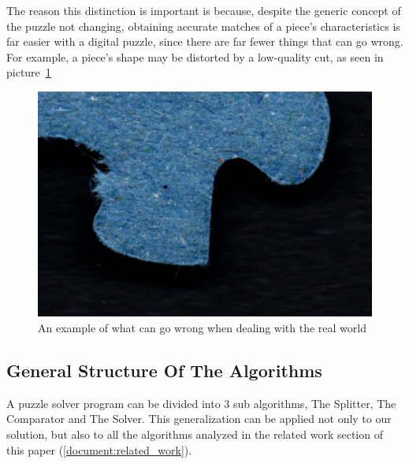 \documentclass{article}
\begin{document}
The reason this distinction is important is because,
despite the generic concept of the puzzle not changing,
obtaining accurate matches of a piece's characteristics
is far easier with a digital puzzle,
since there are far fewer things that can go wrong.
For example, a piece's shape may be distorted by
a low-quality cut, as seen in picture~\cref{fig:figure_measurement_error}

\begin{figure}[H]
    \caption{An example of what can go wrong when dealing with the real world}\label{fig:figure_measurement_error}
    \includegraphics[height=0.25\textwidth]{pictures/example_bad_piece.jpg}
    \centering
\end{figure}

\subsection{General Structure Of The Algorithms}

A puzzle solver program can be divided into 3 sub algorithms,
The Splitter, The Comparator and The Solver.
This generalization can be applied not only to our solution,
but also to all the algorithms analyzed in the related
work section of this paper (\cref{document:related_work}).
\end{document}
